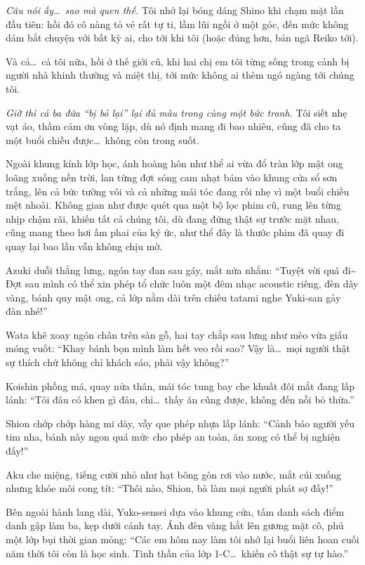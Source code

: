 \documentclass[../main.tex]{subfiles}
\begin{document}
\textit{Câu nói ấy\dots\ sao mà quen thế.} Tôi nhớ lại bóng dáng Shino khi chạm mặt lần đầu tiên: hồi đó cô nàng tỏ vẻ rất tự ti, lầm lũi ngồi ở một góc, đến mức không dám bắt chuyện với bất kỳ ai, cho tới khi tôi (hoặc đúng hơn, bản ngã Reiko tới).

Và cả\dots\ cả tôi nữa, hồi ở thế giới cũ, khi hai chị em tôi từng sống trong cảnh bị người nhà khinh thường và miệt thị, tới mức không ai thèm ngó ngàng tới chúng tôi.

\textit{Giờ thì cả ba đứa ``bị bỏ lại'' lại đủ màu trong cùng một bức tranh.} Tôi siết nhẹ vạt áo, thầm cảm ơn vòng lặp, dù nó định mang đi bao nhiêu, cũng đã cho ta một buổi chiều được\dots\ không còn trong suốt.

Ngoài khung kính lớp học, ánh hoàng hôn như thể ai vừa đổ tràn lớp mật ong loãng xuống nền trời, lan từng đợt sóng cam nhạt bám vào khung cửa sổ sơn trắng, lên cả bức tường vôi và cả những mái tóc đang rối nhẹ vì một buổi chiều mệt nhoài. Không gian như được quét qua một bộ lọc phim cũ, rung lên từng nhịp chậm rãi, khiến tất cả chúng tôi, dù đang đứng thật sự trước mặt nhau, cũng mang theo hơi ấm phai của ký ức, như thể đây là thước phim đã quay đi quay lại bao lần vẫn không chịu mờ.

Azuki duỗi thẳng lưng, ngón tay đan sau gáy, mắt nửa nhắm: ``Tuyệt vời quá đi\~{} Đợt sau mình có thể xin phép tổ chức luôn một đêm nhạc acoustic riêng, đèn dây vàng, bánh quy mật ong, cả lớp nằm dài trên chiếu tatami nghe Yuki-san gảy đàn nhé!''

Wata khẽ xoay ngón chân trên sàn gỗ, hai tay chắp sau lưng như mèo vừa giấu móng vuốt: ``Khay bánh bọn mình làm hết veo rồi sao? Vậy là\dots\ mọi người thật sự thích chứ không chỉ khách sáo, phải vậy không?''

Koishin phồng má, quay nửa thân, mái tóc tung bay che khuất đôi mắt đang lấp lánh: ``Tôi đâu có khen gì đâu, chỉ\dots\ thấy ăn cũng được, không đến nỗi bỏ thừa.''

Shion chớp chớp hàng mi dày, vẫy que phép nhựa lấp lánh: ``Cảnh báo người yếu tim nha, bánh này ngon quá mức cho phép an toàn, ăn xong có thể bị nghiện đấy!''

Aku che miệng, tiếng cười nhỏ như hạt bông gòn rơi vào nước, mắt cúi xuống nhưng khóe môi cong tít: ``Thôi nào, Shion, bà làm mọi người phát sợ đấy!''

Bên ngoài hành lang dài, Yuko-sensei dựa vào khung cửa, tấm danh sách điểm danh gập làm ba, kẹp dưới cánh tay. Ánh đèn vàng hắt lên gương mặt cô, phủ một lớp bụi thời gian mỏng: ``Các em hôm nay làm tôi nhớ lại buổi liên hoan cuối năm thời tôi còn là học sinh. Tinh thần của lớp 1-C\dots\ khiến cô thật sự tự hào.''
\end{document}
